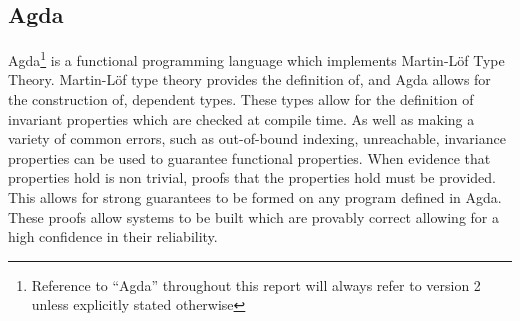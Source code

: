 %






\subsection{Agda}
Agda\footnote{Reference to ``Agda'' throughout this report will always refer to 
version 2 unless explicitly stated otherwise} is a functional programming 
language which implements Martin-Löf Type Theory.\cite{Norell2007}\cite{Martin-Lf1984}
Martin-Löf type theory provides the definition of, and Agda allows for the 
construction of, dependent types.\cite{Norell2007}
These types allow for the definition of invariant properties which are checked
at compile time.\cite{Norell2007}
As well as making a variety of common errors, such as out-of-bound indexing,
unreachable, invariance properties can be used to guarantee functional
properties.\cite{Norell2007}
When evidence that properties hold is non trivial, proofs that the properties
hold must be provided.
This allows for strong guarantees to be formed on any program defined in Agda.
These proofs allow systems to be built which are provably correct allowing for a high confidence in their reliability.\cite{Norell2007}

